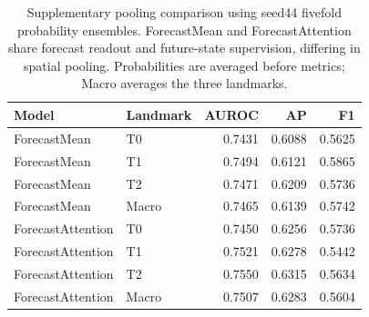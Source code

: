 \begin{table}[t]
\centering
\small
\caption{Supplementary pooling comparison using seed44 fivefold probability ensembles. ForecastMean and ForecastAttention share forecast readout and future-state supervision, differing in spatial pooling. Probabilities are averaged before metrics; Macro averages the three landmarks.}
\label{tab:pooling}
\begin{tabular}{llrrr}
\toprule
Model & Landmark & AUROC & AP & F1 \\
\midrule
ForecastMean & T0 & 0.7431 & 0.6088 & 0.5625 \\
ForecastMean & T1 & 0.7494 & 0.6121 & 0.5865 \\
ForecastMean & T2 & 0.7471 & 0.6209 & 0.5736 \\
ForecastMean & Macro & 0.7465 & 0.6139 & 0.5742 \\
ForecastAttention & T0 & 0.7450 & 0.6256 & 0.5736 \\
ForecastAttention & T1 & 0.7521 & 0.6278 & 0.5442 \\
ForecastAttention & T2 & 0.7550 & 0.6315 & 0.5634 \\
ForecastAttention & Macro & 0.7507 & 0.6283 & 0.5604 \\
\bottomrule
\end{tabular}
\end{table}
